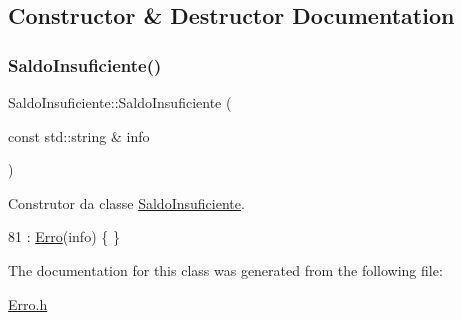 \subsection{Constructor \& Destructor Documentation}
\mbox{\label{classSaldoInsuficiente_aacd4d88be6fe190105bf122355d72df4}} 
\subsubsection{\texorpdfstring{Saldo\+Insuficiente()}{SaldoInsuficiente()}}
{\footnotesize\ttfamily Saldo\+Insuficiente\+::\+Saldo\+Insuficiente (\begin{DoxyParamCaption}\item[{const std\+::string \&}]{info }\end{DoxyParamCaption})\hspace{0.3cm}{\ttfamily [inline]}}



Construtor da classe \hyperlink{classSaldoInsuficiente}{Saldo\+Insuficiente}. 


\begin{DoxyCode}
81 : \hyperlink{classErro_a15d79796bd17517ff05d45eee55556f1}{Erro}(info) \{ \}
\end{DoxyCode}


The documentation for this class was generated from the following file\+:\begin{DoxyCompactItemize}
\item 
\hyperlink{Erro_8h}{Erro.\+h}\end{DoxyCompactItemize}

